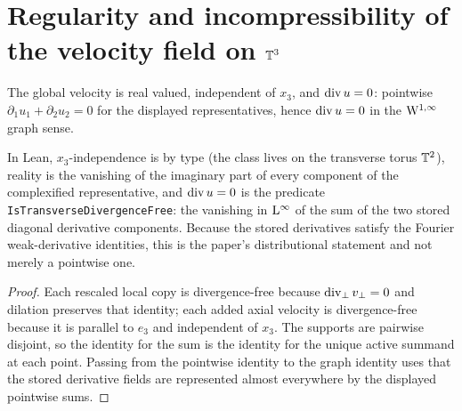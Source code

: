 \section{Regularity and incompressibility of the velocity field on $\mathbb{T}^3$}

\begin{lemma}
  \label{lem:velocity:divergence-free}
  \leanok
  The global velocity is real valued, independent of $x_3 $, and $\operatorname{div} u=0 $: pointwise
  $\partial_1u_1+\partial_2u_2=0 $ for the displayed representatives, hence $\operatorname{div} u=0 $ in
  the $\mathrm{W}^{1,\infty} $ graph sense.
\end{lemma}

In Lean, $x_3 $-independence is by type (the class lives on the transverse torus $\mathbb{T}^2 $),
reality is the vanishing of the imaginary part of every component of the complexified
representative, and $\operatorname{div} u=0 $ is the predicate \texttt{IsTransverseDivergenceFree}: the
vanishing in $\mathrm{L}^\infty $ of the sum of the two stored diagonal derivative components.
Because the stored derivatives satisfy the Fourier weak-derivative identities, this is the
paper's distributional statement and not merely a pointwise one.

\begin{proof}
  \leanok
  Each rescaled local copy is divergence-free because $\operatorname{div}_\perp v_\perp=0 $ and dilation
  preserves that identity; each added axial velocity is divergence-free because it is
  parallel to $e_3 $ and independent of $x_3 $.  The supports are pairwise disjoint, so the
  identity for the sum is the identity for the unique active summand at each point.  Passing
  from the pointwise identity to the graph identity uses that the stored derivative fields
  are represented almost everywhere by the displayed pointwise sums.
\end{proof}

